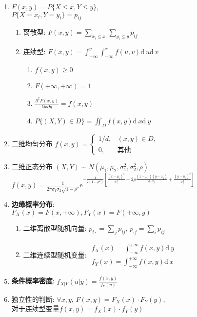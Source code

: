 \documentclass[10pt,a4paper,nofonts]{ctexart}
\newcommand{\D}{\displaystyle}
\renewcommand{\d}{{\mathrm{d}\:\!}}
\newcommand{\e}{{\mathrm{e}}}
\renewcommand{\le}{\leqslant}
\renewcommand{\ge}{\geqslant}
\begin{document}
\begin{multicols}{2}
\begin{enumerate}
\item $F(x,y)=P\{X\le x,Y\le y\}$,\\$P\{X=x_i,Y=y_i\}=p_{ij}$
\begin{enumerate}
\item 离散型: $F(x,y)=\sum_{x_i\le x}\,\sum_{y_i\le y}p_{ij}$
\item 连续型: $F(x,y)=\int_{-\infty}^{y}\int_{-\infty}^{x}f(u,v)\d u\d v$
\begin{enumerate}
\item $f(x,y)\ge 0$
\item $F(+\infty,+\infty)=1$
\item $\D\frac{\partial^2 F(x,y)}{\partial x \partial y}=f(x,y)$
\item $P\{(X,Y)\in D\}=\iint_D f(x,y)\d x\d y$
\end{enumerate}
\end{enumerate}
\item 二维均匀分布
$f(x,y)=\left\{\begin{array}{cl}
{1}/{d}, & (x,y)\in D,\\
0, & \text{其他}
\end{array}\right.$
\item 二维正态分布 $(X,Y)\sim N(\mu_1,\mu_2,\sigma_1^2,\sigma_2^2,\rho)$\\
$\D f(x,y)=\frac{1}{2\pi\sigma_1\sigma_2\sqrt{1-\rho^2}}\e^{-\frac{1}{2(1-\rho^2)}\left[\frac{(x-\mu_1)^2}{\sigma_1^2}-2\rho\frac{(x-\mu_1)(y-\mu_2)}{\sigma_1\sigma_2}+\frac{(y-\mu_2)^2}{\sigma_2^2}\right]}$
\item {\bf 边缘概率分布}:\\$F_X(x)=F(x,+\infty), F_Y(x)=F(+\infty,y)$
\begin{enumerate}
\item 二维离散型随机向量: $p_{i\cdot}=\sum_j p_{ij}$, $p_{\cdot j}=\sum_i p_{ij}$
\item 二维连续型随机变量: $\begin{array}{l}
f_X(x)=\int_{-\infty}^{+\infty}f(x,y)\d y\\
f_Y(x)=\int_{-\infty}^{+\infty}f(x,y)\d x
\end{array}$
\end{enumerate}
\item {\bf 条件概率密度}: $f_{X|Y}(u|y)=\D\frac{f(x,y)}{f_Y(y)}$
\item 独立性的判断: $\forall x,y$, $F(x,y)=F_X(x)\cdot F_Y(y)$, \\对于连续型变量$f(x,y)=f_X(x)\cdot f_Y(y)$


\end{enumerate}
\end{multicols}
\end{document}
